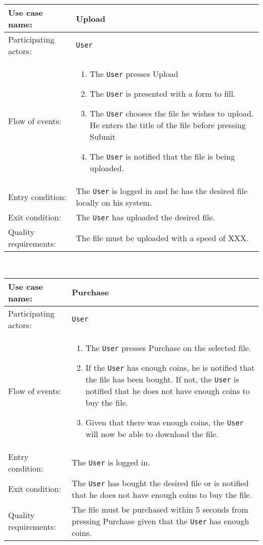 \documentclass[../report.tex]{subfiles}
\begin{document}
\noindent
\begin{tabular}{| l | p{8cm} |}
  \hline                        
 Use case name:  & Upload   \\   \hline                
 Participating actors:  & \texttt{User} \\   \hline          
  Flow of events: & \begin{enumerate}
\item{The \texttt{User} presses Upload}
\item{The \texttt{User} is presented with a form to fill.}
\item{The \texttt{User} chooses the file he wishes to upload. He enters the title of the file before pressing Submit}
\item{The \texttt{User} is notified that the file is being uploaded.}
\end{enumerate}
 \\   \hline 
Entry condition: & The \texttt{User} is logged in and he has the desired file locally on his system. \\ \hline
Exit condition: & The \texttt{User} has uploaded the desired file. \\ \hline
Quality requirements: & The file must be uploaded with a speed of XXX. \\ \hline             
\end{tabular} \\

\noindent
\begin{tabular}{| l | p{8cm} |}
  \hline                        
 Use case name:  & Purchase   \\   \hline                
 Participating actors:  & \texttt{User} \\   \hline          
  Flow of events: & \begin{enumerate}
\item{The \texttt{User} presses Purchase on the selected file.}
\item{If the \texttt{User} has enough coins, he is notified that the file has been bought. If not, the \texttt{User} is notified that he does not have enough coins to buy the file.}
\item{Given that there was enough coins, the \texttt{User} will now be able to download the file.}
\end{enumerate}
 \\   \hline 
Entry condition: & The \texttt{User} is logged in. \\ \hline
Exit condition: & The \texttt{User} has bought the desired file or is notified that he does not have enough coins to buy the file. \\ \hline
Quality requirements: & The file must be purchased within 5 seconds from pressing Purchase given that the \texttt{User} has enough coins. \\ \hline             
\end{tabular} \\
\end{document}
